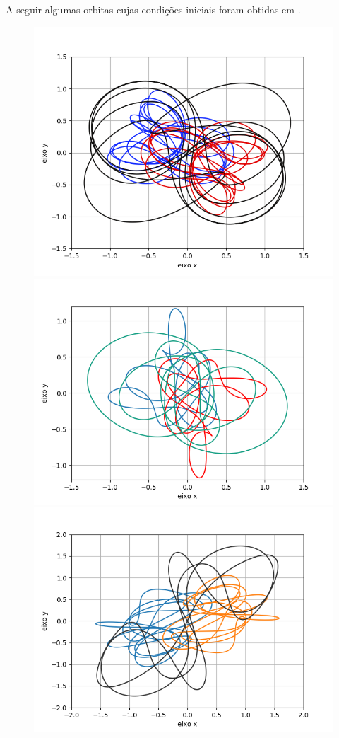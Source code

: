 \documentclass[a4paper.12pt]{article}
\begin{document}
	A seguir algumas orbitas cujas condições iniciais foram obtidas em \cite{orbitas}.
	
	\begin{figure}[H]
		\includegraphics[scale=0.5]{Figure_8.png}
		\includegraphics[scale=0.5]{Figure_13.png}
		\includegraphics[scale=0.5]{Figure_14.png}

\end{figure}
\end{document}
